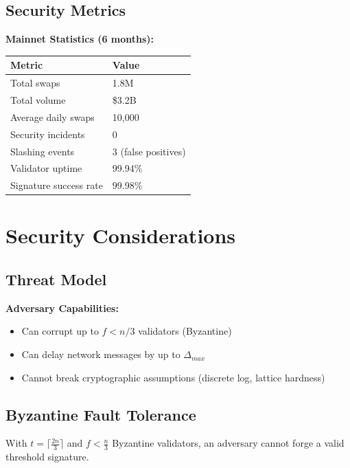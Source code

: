 \documentclass[11pt]{article}
\begin{document}
\subsection{Security Metrics}

\textbf{Mainnet Statistics (6 months):}
\begin{table}[h]
\centering
\begin{tabular}{@{}ll@{}}
\toprule
\textbf{Metric} & \textbf{Value} \\
\midrule
Total swaps & 1.8M \\
Total volume & \$3.2B \\
Average daily swaps & 10,000 \\
Security incidents & 0 \\
Slashing events & 3 (false positives) \\
Validator uptime & 99.94\% \\
Signature success rate & 99.98\% \\
\bottomrule
\end{tabular}

\label{tab:mainnet-stats}
\end{table}

\section{Security Considerations}

\subsection{Threat Model}

\textbf{Adversary Capabilities:}
\begin{itemize}
\item Can corrupt up to $f < n/3$ validators (Byzantine)
\item Can delay network messages by up to $\Delta_{max}$
\item Cannot break cryptographic assumptions (discrete log, lattice hardness)
\end{itemize}

\subsection{Byzantine Fault Tolerance}

\begin{theorem}
With $t = \lceil \frac{2n}{3} \rceil$ and $f < \frac{n}{3}$ Byzantine validators, an adversary cannot forge a valid threshold signature.
\end{theorem}
\end{document}
